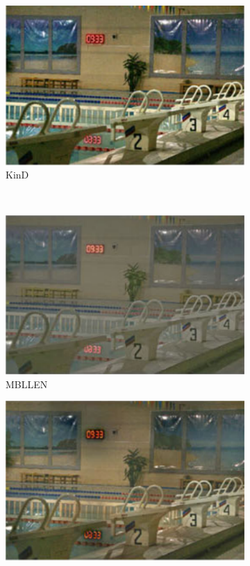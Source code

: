 \documentclass[a4paper]{ctexart}
\begin{document}
\begin{figure}[htb]
\begin{subfigure}{0.19\textwidth}
		\includegraphics[width=\linewidth]{picture/LLIE/Efficent/KinD}
		\captionsetup{font=scriptsize}
		\caption{KinD}
		\label{fig: KinD}	
	\end{subfigure}\\
	\begin{subfigure}{0.19\textwidth}
		\includegraphics[width=\linewidth]{picture/LLIE/Efficent/MBLLEN}
		\captionsetup{font=scriptsize}
		\caption{MBLLEN}
		\label{fig: MBLLEN}	
	\end{subfigure}
	\begin{subfigure}{0.19\textwidth}
		\includegraphics[width=\linewidth]{picture/LLIE/Efficent/EnlightenGAN}

\end{subfigure}
\end{figure}
\end{document}
